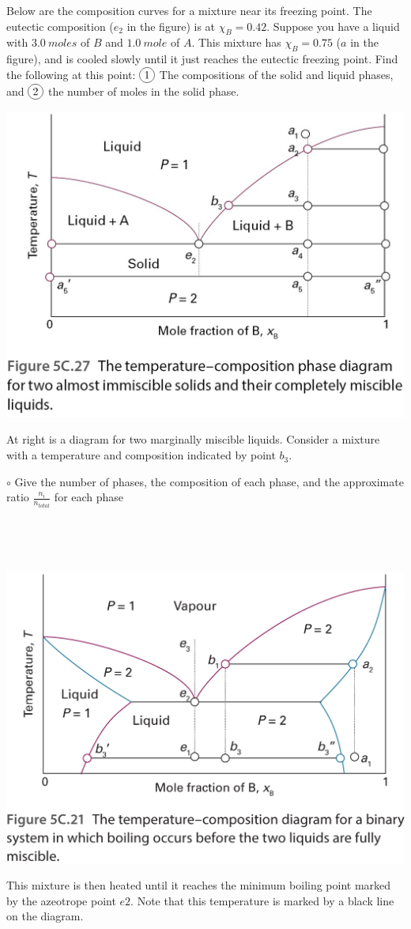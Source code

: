 \documentclass[11pt, letterpaper]{memoir}
\begin{document}
{\vspace{2em}\noindent
Below are the composition curves for a mixture near its freezing point. The eutectic composition ($e_2$ in the figure) is at $\chi_B = 0.42$. Suppose you have a liquid with $3.0~moles$ of $B$ and $1.0~mole$ of $A$. This mixture has $\chi_B=0.75$ ($a$ in the figure), and is cooled slowly until it just reaches the eutectic freezing point. Find the following at this point: $\circled{1}$ The compositions of the solid and liquid phases, and $\circled{2}$ the number of moles in the solid phase.

\noindent\includegraphics[width=0.6\linewidth]{Eutectic}

\vspace{2em}\noindent
\begin{minipage}{0.55\textwidth}
	\noindent At right is a diagram for two marginally miscible liquids. Consider a mixture with a temperature and composition indicated by point $b_3$.

	\noindent  $\circ$ Give the number of phases, the composition of each phase, and the approximate ratio $\frac{n_i}{n_{total}}$ for each phase
		
	\vspace{9em}
	~
	
	

\end{minipage} ~~
\begin{minipage}{0.55\textwidth}
	\noindent\includegraphics[width=\linewidth]{Bunny_Ears}
\end{minipage}
\noindent This mixture is then heated until it reaches the minimum boiling point marked by the azeotrope point $e2$. Note that this temperature is marked by a black line on the diagram. 

}
\end{document}
